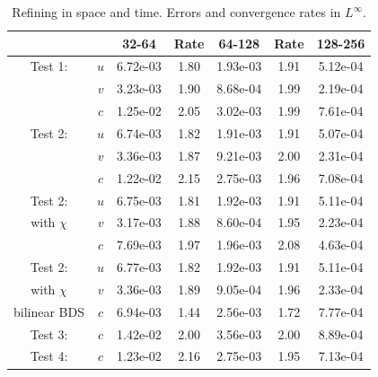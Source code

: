 \documentclass[final]{siamltex}
\begin{document}
\begin{table}[h]
\begin{center}
\caption{Refining in space and time.  Errors and convergence rates in $L^\infty$.}
\begin{tabular}{ccccccc}
& & 32-64 & Rate & 64-128 & Rate & 128-256 \\
\hline
Test 1:             & $u$ & 6.72e-03 & 1.80 & 1.93e-03 & 1.91 & 5.12e-04 \\
                    & $v$ & 3.23e-03 & 1.90 & 8.68e-04 & 1.99 & 2.19e-04 \\
                    & $c$ & 1.25e-02 & 2.05 & 3.02e-03 & 1.99 & 7.61e-04 \\
\hline
Test 2:             & $u$ & 6.74e-03 & 1.82 & 1.91e-03 & 1.91 & 5.07e-04 \\
                    & $v$ & 3.36e-03 & 1.87 & 9.21e-03 & 2.00 & 2.31e-04 \\
                    & $c$ & 1.22e-02 & 2.15 & 2.75e-03 & 1.96 & 7.08e-04 \\
\hline
Test 2:             & $u$ & 6.75e-03 & 1.81 & 1.92e-03 & 1.91 & 5.11e-04 \\
with $\chi$         & $v$ & 3.17e-03 & 1.88 & 8.60e-04 & 1.95 & 2.23e-04 \\
                    & $c$ & 7.69e-03 & 1.97 & 1.96e-03 & 2.08 & 4.63e-04 \\
\hline
Test 2:             & $u$ & 6.77e-03 & 1.82 & 1.92e-03 & 1.91 & 5.11e-04 \\
with $\chi$         & $v$ & 3.36e-03 & 1.89 & 9.05e-04 & 1.96 & 2.33e-04 \\
bilinear BDS        & $c$ & 6.94e-03 & 1.44 & 2.56e-03 & 1.72 & 7.77e-04 \\
\hline
Test 3:             & $c$ & 1.42e-02 & 2.00 & 3.56e-03 & 2.00 & 8.89e-04 \\
\hline
Test 4:             & $c$ & 1.23e-02 & 2.16 & 2.75e-03 & 1.95 & 7.13e-04
\end{tabular}
\end{center}
\end{table}
\end{document}
